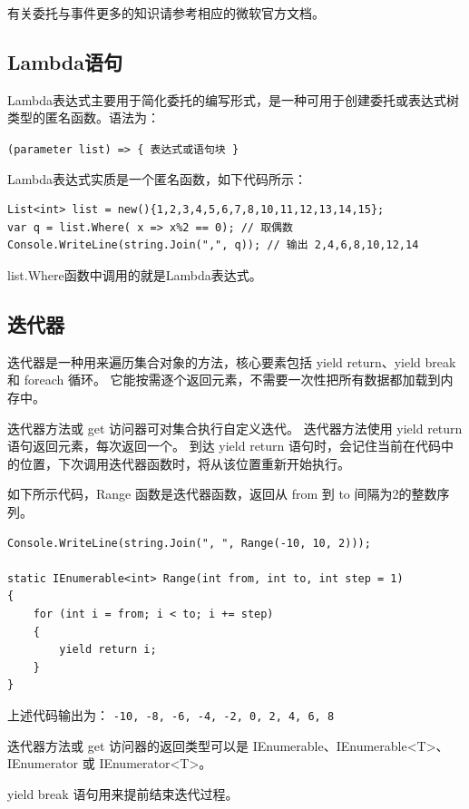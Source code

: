 有关委托与事件更多的知识请参考相应的微软官方文档。

\subsection{Lambda语句}

Lambda表达式主要用于简化委托的编写形式，是一种可用于创建委托或表达式树类型的匿名函数。语法为：

\verb|(parameter list) => { 表达式或语句块 } |

Lambda表达式实质是一个匿名函数，如下代码所示：

\begin{lstlisting}
List<int> list = new(){1,2,3,4,5,6,7,8,10,11,12,13,14,15};
var q = list.Where( x => x%2 == 0); // 取偶数
Console.WriteLine(string.Join(",", q)); // 输出 2,4,6,8,10,12,14
\end{lstlisting}

list.Where函数中调用的就是Lambda表达式。

\subsection{迭代器}

\cs 迭代器是一种用来遍历集合对象的方法，核心要素包括 yield return、yield break 和 foreach 循环。
它能按需逐个返回元素，不需要一次性把所有数据都加载到内存中。


迭代器方法或 get 访问器可对集合执行自定义迭代。 迭代器方法使用 yield return 语句返回元素，每次返回一个。
到达 yield return 语句时，会记住当前在代码中的位置，下次调用迭代器函数时，将从该位置重新开始执行。

如下所示代码，Range 函数是迭代器函数，返回从 from 到 to 间隔为2的整数序列。

\begin{lstlisting}
Console.WriteLine(string.Join(", ", Range(-10, 10, 2)));

static IEnumerable<int> Range(int from, int to, int step = 1)
{
    for (int i = from; i < to; i += step)
    {
        yield return i;
    }
}
\end{lstlisting}

上述代码输出为： \verb|-10, -8, -6, -4, -2, 0, 2, 4, 6, 8|

迭代器方法或 get 访问器的返回类型可以是 IEnumerable、IEnumerable<T>、IEnumerator
或 IEnumerator<T>。

yield break 语句用来提前结束迭代过程。






